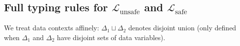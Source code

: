 \documentclass[preprint]{uai2026} %
\newcommand{\unittype}{\mathbb{1}}
\newcommand{\Bool}{\mathbb{2}}
\newcommand{\Lsafe}{\mathcal{L}_{\text{safe}}}
\newcommand{\Lunsafe}{\mathcal{L}_{\text{unsafe}}}
\newcommand{\safevdash}{\vdash_{\text{s}}}
\newcommand{\unsafevdash}{\vdash_{\text{u}}}
\newcommand{\df}{\overset{\Delta}{=}}
\newcommand{\Meas}{\mathsf{Meas}}
\newcommand{\Prob}{\mathsf{Prob}}
\begin{document}
\clearpage


\subsection{Full typing rules for $\Lunsafe$ and $\Lsafe$}\label{app:typing}

We treat data contexts affinely: $\Delta_1\sqcup \Delta_2$ denotes disjoint union (only defined when $\Delta_1$ and $\Delta_2$ have disjoint sets of data variables).
\end{document}
